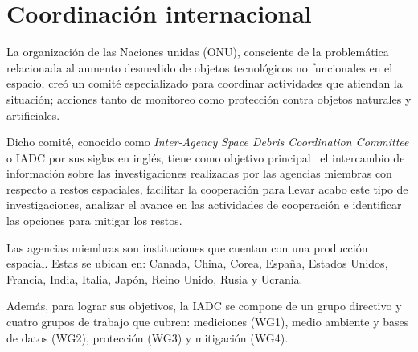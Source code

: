 \section*{Coordinación internacional} \label{sec:coordinacion}

La organización de las Naciones unidas (ONU), consciente de la problemática relacionada al aumento desmedido de objetos tecnológicos no funcionales en el espacio, creó un comité especializado para coordinar actividades que atiendan la situación;
acciones tanto de monitoreo como protección contra objetos naturales y artificiales.

Dicho comité, conocido como  \textit{Inter-Agency Space Debris Coordination Committee} o IADC por sus siglas en inglés,
tiene como objetivo principal~\cite{iadc} el intercambio de información sobre las investigaciones realizadas por las agencias miembras con respecto a restos espaciales,
facilitar la cooperación para llevar acabo este tipo de investigaciones, 
analizar el avance en las actividades de cooperación 
e identificar las opciones para mitigar los restos.

Las agencias miembras son instituciones que cuentan con una producción espacial. 
Estas se ubican en:  
Canada, China, Corea, España, Estados Unidos, Francia, India, Italia, Japón, Reino Unido, Rusia y Ucrania.

Además, para lograr sus objetivos,
la IADC se compone de un grupo directivo y cuatro grupos de trabajo que cubren:
mediciones (WG1),
medio ambiente y bases de datos (WG2),
protección (WG3) 
y
mitigación (WG4).

